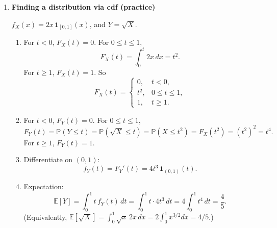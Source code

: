 \documentclass[11pt]{article}
\begin{document}
\begin{enumerate}
\bigskip

\item \textbf{Finding a distribution via cdf (practice)}

$f_X(x)=2x\,\mathbf{1}_{[0,1]}(x)$, and $Y=\sqrt{X}$.

\begin{enumerate}[label=(\alph*)]
\item For $t<0$, $F_X(t)=0$. For $0\le t\le 1$,
\[
F_X(t)=\int_0^t 2x\,dx=t^2.
\]
For $t\ge 1$, $F_X(t)=1$.
So
\[
F_X(t)=
\begin{cases}
0,& t<0,\\
t^2,& 0\le t\le 1,\\
1,& t\ge 1.
\end{cases}
\]

\item For $t<0$, $F_Y(t)=0$. For $0\le t\le 1$,
\[
F_Y(t)=\mathbb{P}(Y\le t)=\mathbb{P}(\sqrt{X}\le t)=\mathbb{P}(X\le t^2)=F_X(t^2)=(t^2)^2=t^4.
\]
For $t\ge 1$, $F_Y(t)=1$.

\item Differentiate on $(0,1)$:
\[
f_Y(t)=F_Y'(t)=4t^3\,\mathbf{1}_{(0,1)}(t).
\]

\item Expectation:
\[
\mathbb{E}[Y]=\int_0^1 t\,f_Y(t)\,dt=\int_0^1 t\cdot 4t^3\,dt
=4\int_0^1 t^4\,dt=\frac{4}{5}.
\]
(Equivalently, $\mathbb{E}[\sqrt{X}]=\int_0^1 \sqrt{x}\,2x\,dx=2\int_0^1 x^{3/2}dx=4/5$.)
\end{enumerate}

\end{enumerate}
\end{document}
